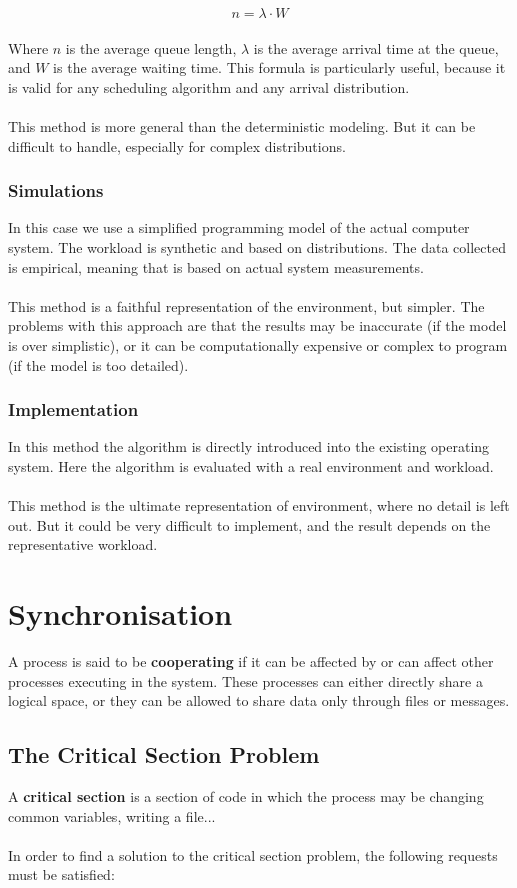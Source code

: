 \documentclass{article}
\begin{document}
\[ n = \lambda \cdot W \] \\
Where $n$ is the average queue length, $\lambda$ is the average arrival time at the queue, and $W$ is the average waiting time. This formula is particularly useful, because it is valid for any scheduling algorithm and any arrival distribution. \\ \\
This method is more general than the deterministic modeling. But it can be difficult to handle, especially for complex distributions.

\subsubsection{Simulations}
In this case we use a simplified programming model of the actual computer system. The workload is synthetic and based on distributions. The data collected is empirical, meaning that is based on actual system measurements. \\ \\
This method is a faithful representation of the environment, but simpler. The problems with this approach are that the results may be inaccurate (if the model is over simplistic), or it can be computationally expensive or complex to program (if the model is too detailed).

\subsubsection{Implementation}
In this method the algorithm is directly introduced into the existing operating system. Here the algorithm is evaluated with a real environment and workload. \\ \\
This method is the ultimate representation of environment, where no detail is left out. But it could be very difficult to implement, and the result depends on the representative workload.

\section{Synchronisation}
A process is said to be \textbf{cooperating} if it can be affected by or can affect other processes executing in the system. These processes can either directly share a logical space, or they can be allowed to share data only through files or messages.

\subsection{The Critical Section Problem}
A \textbf{critical section} is a section of code in which the process may be changing common variables, writing a file... \\ \\
In order to find a solution to the critical section problem, the following requests must be satisfied:
\end{document}
